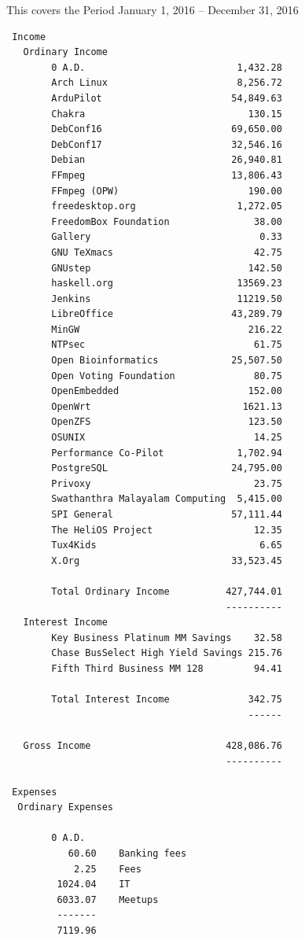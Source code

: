 \documentclass[letterpaper]{report}
\begin{document}
This covers the Period January 1, 2016 -- December 31, 2016

\begin{verbatim}
 Income
   Ordinary Income
        0 A.D.                           1,432.28
        Arch Linux                       8,256.72
        ArduPilot                       54,849.63
        Chakra                             130.15
        DebConf16                       69,650.00
        DebConf17                       32,546.16
        Debian                          26,940.81
        FFmpeg                          13,806.43
        FFmpeg (OPW)                       190.00
        freedesktop.org                  1,272.05
        FreedomBox Foundation               38.00
        Gallery                              0.33
        GNU TeXmacs                         42.75
        GNUstep                            142.50
        haskell.org                      13569.23
        Jenkins                          11219.50
        LibreOffice                     43,289.79
        MinGW                              216.22
        NTPsec                              61.75
        Open Bioinformatics             25,507.50
        Open Voting Foundation              80.75
        OpenEmbedded                       152.00
        OpenWrt                           1621.13
        OpenZFS                            123.50
        OSUNIX                              14.25
        Performance Co-Pilot             1,702.94
        PostgreSQL                      24,795.00
        Privoxy                             23.75
        Swathanthra Malayalam Computing  5,415.00
        SPI General                     57,111.44
        The HeliOS Project                  12.35
        Tux4Kids                             6.65
        X.Org                           33,523.45

        Total Ordinary Income          427,744.01
                                       ----------
   Interest Income
        Key Business Platinum MM Savings    32.58
        Chase BusSelect High Yield Savings 215.76
        Fifth Third Business MM 128         94.41

        Total Interest Income              342.75
                                           ------

   Gross Income                        428,086.76
                                       ----------

 Expenses
  Ordinary Expenses

        0 A.D.
           60.60    Banking fees
            2.25    Fees
         1024.04    IT
         6033.07    Meetups
         -------
         7119.96


\end{verbatim}
\end{document}
